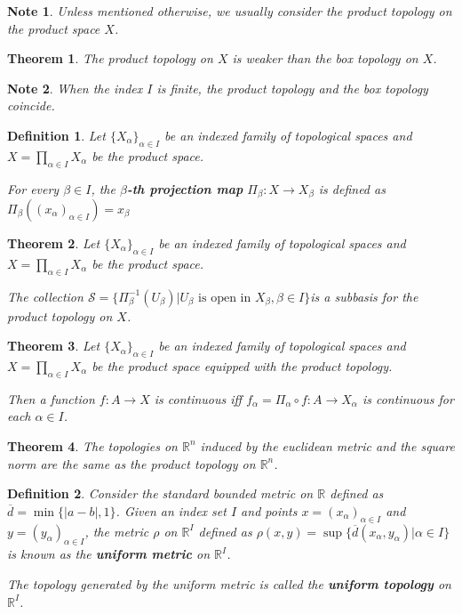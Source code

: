 \documentclass[14pt,twoside]{extreport}
\theoremstyle{dotless}
\newtheorem*{defn}{Definition}
\newtheorem*{thm}{Theorem} %
\newtheorem*{note}{Note} %
\begin{document}
\begin{note}
    Unless mentioned otherwise, we usually consider the product topology on the product space $X$.
\end{note}

\begin{thm}
    The product topology on $X$ is weaker than the box topology on $X$.
\end{thm}

\begin{note}
    When the index $I$ is finite, the product topology and the box topology coincide.
\end{note}

\begin{defn}
    Let $\{ X_\alpha \}_{\alpha \in I}$ be an indexed family of topological spaces and $X = \prod_{\alpha \in I} X_\alpha$ be the product space. 

    For every $\beta \in I$, the \textbf{$\beta$-th projection map} $\Pi_\beta: X \to X_\beta$ is defined as $\Pi_\beta ( (x_\alpha)_{\alpha \in I} ) = x_\beta$
\end{defn}

\begin{thm}
Let $\{ X_\alpha \}_{\alpha \in I}$ be an indexed family of topological spaces and $X = \prod_{\alpha \in I} X_\alpha$ be the product space. 

    The collection $\mathscr{S} = \{ \Pi^{-1}_\beta (U_\beta) | U_\beta \text{ is open in } X_\beta, \beta \in I \}$is a subbasis for the product topology on $X$.
\end{thm}

\begin{thm}
Let $\{ X_\alpha \}_{\alpha \in I}$ be an indexed family of topological spaces and $X = \prod_{\alpha \in I} X_\alpha$ be the product space equipped with the product topology.

    Then a function $f: A \to X$ is continuous iff $f_\alpha = \Pi_\alpha \circ f : A \to X_\alpha$ is continuous for each $\alpha \in I$.
\end{thm}

\begin{thm}
    The topologies on $\mathbb{R}^n$ induced by the euclidean metric and the square norm are the same as the product topology on $\mathbb{R}^n$.
\end{thm}

\begin{defn}
    Consider the standard bounded metric on $\mathbb{R}$ defined as $\overline{d} = \min\{ |a-b|, 1\}$.
    Given an index set $I$ and points $x = (x_\alpha)_{\alpha \in I}$ and $y = (y_\alpha)_{\alpha \in I}$, the metric $\rho$ on $\mathbb{R}^I$ defined  as $\rho(x,y) = \sup \{ \overline{d}(x_\alpha, y_\alpha) | \alpha \in I \}$ is known as the \textbf{uniform metric} on $\mathbb{R}^I$.

    The topology generated by the uniform metric is called the \textbf{uniform topology} on $\mathbb{R}^I$.
\end{defn}
\end{document}
